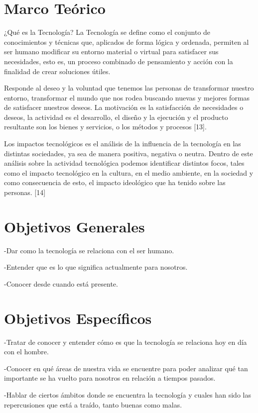 \documentclass{bmcart}
\begin{document}
\section*{Marco Teórico}
¿Qué es la Tecnología? La Tecnología se define como el conjunto de conocimientos y técnicas que, aplicados de forma lógica y ordenada, permiten al ser humano modificar su entorno material o virtual para satisfacer sus necesidades, esto es, un proceso combinado de pensamiento y acción con la finalidad de crear soluciones útiles.\smallskip

Responde al deseo y la voluntad que tenemos las personas de transformar nuestro entorno, transformar el mundo que nos rodea buscando nuevas y mejores formas de satisfacer nuestros deseos. La motivación es la satisfacción de necesidades o deseos, la actividad es el desarrollo, el diseño y la ejecución y el producto resultante son los bienes y servicios, o los métodos y procesos [13].\smallskip

Los impactos tecnológicos es el análisis de la influencia de la tecnología en las distintas sociedades, ya sea de manera positiva, negativa o neutra. Dentro de este análisis sobre la actividad tecnológica podemos identificar distintos focos, tales como el impacto tecnológico en la cultura, en el medio ambiente, en la sociedad y como consecuencia de esto, el impacto ideológico que ha tenido sobre las personas. [14]\smallskip



\section*{Objetivos Generales}
\smallskip
-Dar como la tecnología se relaciona con el ser humano.\smallskip

-Entender que es lo que significa actualmente para nosotros.\smallskip

-Conocer desde cuando está presente.

\section*{Objetivos Específicos}
\smallskip
-Tratar de conocer y entender cómo es que la tecnología se relaciona hoy en día con el hombre.\smallskip

-Conocer en qué áreas de nuestra vida se encuentre para poder analizar qué tan importante se ha vuelto para nosotros en relación a tiempos pasados.\smallskip

-Hablar de ciertos ámbitos donde se encuentra la tecnología y cuales han sido las repercusiones que está a traído, tanto buenas como malas.\smallskip
\end{document}
